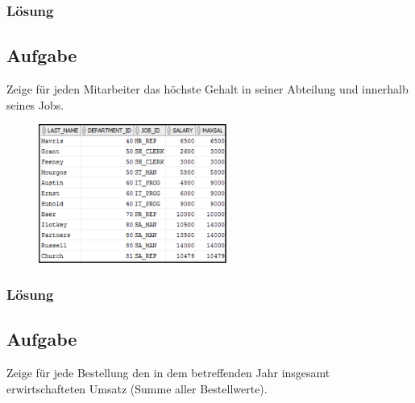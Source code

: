\subsubsection{Lösung}
\label{subsubsec:uebung_12.aufgabe_05.loesung}


\subsection{Aufgabe}
\label{subsec:uebung_12.aufgabe_06}
Zeige für jeden Mitarbeiter das höchste Gehalt in seiner Abteilung und innerhalb seines Jobs.

\begin{figure}[H]
  \centering
  \includegraphics[width=0.55\textwidth]{img//uebung_12_-_aufgabe_06.png}
  \label{img:uebung_12_-_aufgabe_06}
\end{figure}

\subsubsection*{Lösung}
\label{subsubsec:uebung_12.aufgabe_06.loesung}


\subsection{Aufgabe}
\label{subsec:uebung_12.aufgabe_07}
Zeige für jede Bestellung den in dem betreffenden Jahr insgesamt erwirtschafteten Umsatz (Summe aller Bestellwerte).


